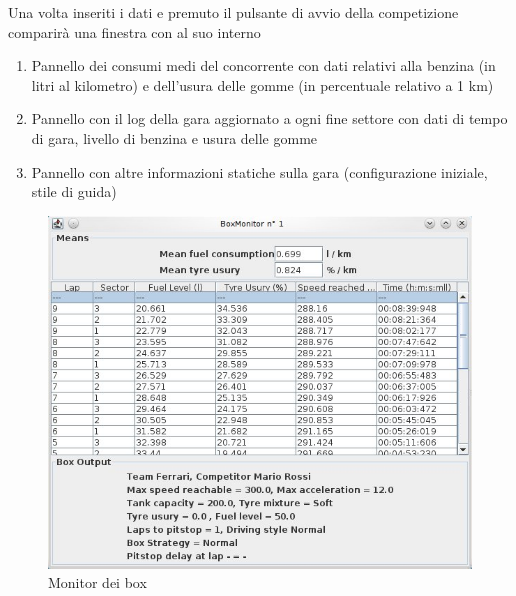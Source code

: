 Una volta inseriti i dati e premuto il pulsante di avvio della competizione comparir\`{a} una finestra con al suo interno 
\begin{enumerate}
\item Pannello dei consumi medi del concorrente con dati relativi alla benzina (in litri al kilometro) e dell'usura delle gomme (in percentuale relativo a 1 km)
\item Pannello con il log della gara aggiornato a ogni fine settore con dati di tempo di gara, livello di benzina e usura delle gomme
\item Pannello con altre informazioni statiche sulla gara (configurazione iniziale, stile di guida)
\end{enumerate}
\begin{center}
\begin{figure}[H]
	\includegraphics[scale=0.75]{img/ScreenshotRelazione/boxMonitor.jpg}
	\caption{Monitor dei box}
\end{figure}
\end{center}
